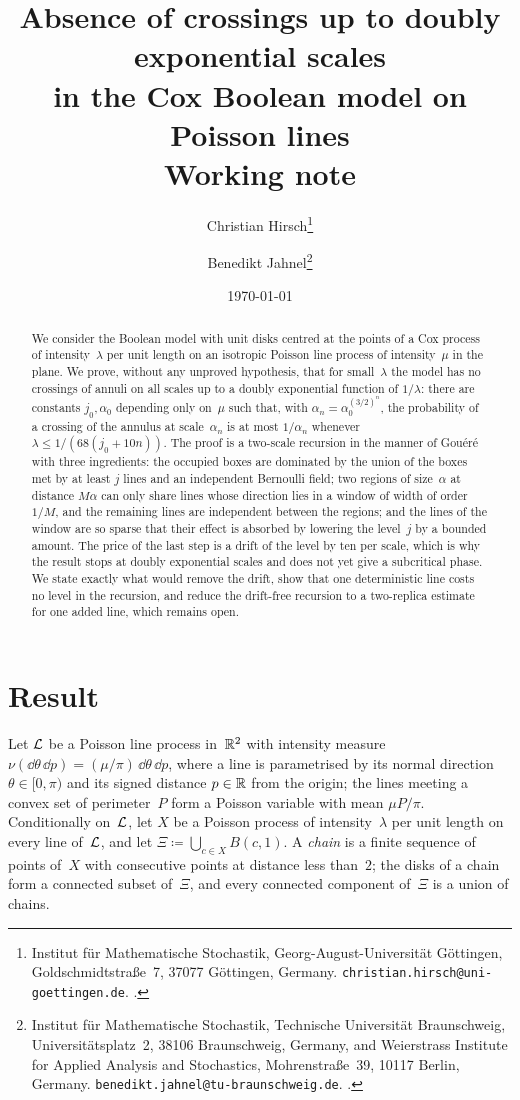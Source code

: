 \documentclass[11pt,letterpaper]{article}
\title{\textbf{Absence of crossings up to doubly exponential scales\\ in the Cox Boolean model on Poisson lines}\\[0.6em] \large Working note}
\author{%
  Christian Hirsch\thanks{Institut f\"ur Mathematische Stochastik, Georg-August-Universit\"at G\"ottingen, Goldschmidtstra\ss e~7, 37077 G\"ottingen, Germany. \texttt{christian.hirsch@uni-goettingen.de}. \orcid{0000-0003-4136-3740}.}
  \and
  Benedikt Jahnel\thanks{Institut f\"ur Mathematische Stochastik, Technische Universit\"at Braunschweig, Universit\"atsplatz~2, 38106 Braunschweig, Germany, and Weierstrass Institute for Applied Analysis and Stochastics, Mohrenstra\ss e~39, 10117 Berlin, Germany. \texttt{benedikt.jahnel@tu-braunschweig.de}. \orcid{0000-0002-4212-0065}.}%
}
\date{\today}
\begin{document}
\maketitle
\thispagestyle{plain}

\begin{abstract}
We consider the Boolean model with unit disks centred at the points of a Cox process of intensity~$\lambda$ per unit length on an isotropic Poisson line process of intensity~$\mu$ in the plane. We prove, without any unproved hypothesis, that for small~$\lambda$ the model has no crossings of annuli on all scales up to a doubly exponential function of $1/\lambda$: there are constants $j_0,\alpha_0$ depending only on~$\mu$ such that, with $\alpha_n=\alpha_0^{(3/2)^n}$, the probability of a crossing of the annulus at scale~$\alpha_n$ is at most $1/\alpha_n$ whenever $\lambda\le1/(68(j_0+10n))$. The proof is a two-scale recursion in the manner of Gou\'er\'e with three ingredients: the occupied boxes are dominated by the union of the boxes met by at least $j$ lines and an independent Bernoulli field; two regions of size~$\alpha$ at distance $M\alpha$ can only share lines whose direction lies in a window of width of order $1/M$, and the remaining lines are independent between the regions; and the lines of the window are so sparse that their effect is absorbed by lowering the level~$j$ by a bounded amount. The price of the last step is a drift of the level by ten per scale, which is why the result stops at doubly exponential scales and does not yet give a subcritical phase. We state exactly what would remove the drift, show that one deterministic line costs no level in the recursion, and reduce the drift-free recursion to a two-replica estimate for one added line, which remains open.
\end{abstract}

\section{Result}
\label{sec:result}

Let $\mathcal L$ be a Poisson line process in~$\mathbb R^2$ with intensity measure $\nu(\dd\theta\,\dd p)=(\mu/\pi)\,\dd\theta\,\dd p$, where a line is parametrised by its normal direction $\theta\in[0,\pi)$ and its signed distance $p\in\mathbb R$ from the origin; the lines meeting a convex set of perimeter~$P$ form a Poisson variable with mean $\mu P/\pi$. Conditionally on~$\mathcal L$, let $X$ be a Poisson process of intensity~$\lambda$ per unit length on every line of~$\mathcal L$, and let $\Xi\coloneqq\bigcup_{c\in X}B(c,1)$. A \emph{chain} is a finite sequence of points of~$X$ with consecutive points at distance less than~$2$; the disks of a chain form a connected subset of~$\Xi$, and every connected component of~$\Xi$ is a union of chains.
\end{document}
